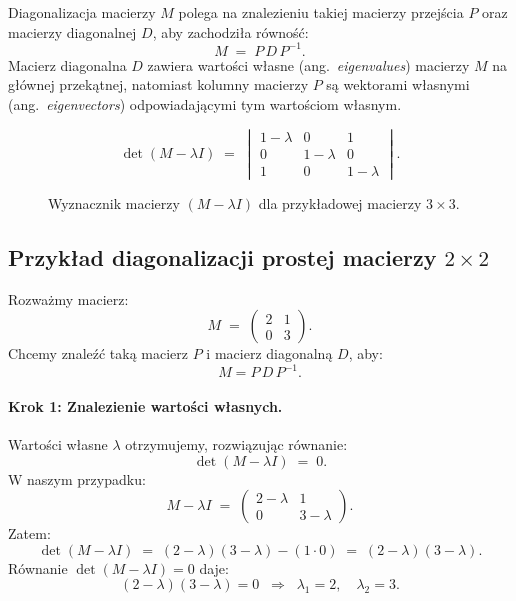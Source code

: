 
\vspace{1em}
\noindent

Diagonalizacja macierzy \(M\) polega na znalezieniu takiej macierzy przejścia \(P\) oraz macierzy diagonalnej \(D\), aby zachodziła równość:
\[
M \;=\; P \,D\, P^{-1}.
\]
Macierz diagonalna \(D\) zawiera wartości własne (ang.~\emph{eigenvalues}) macierzy \(M\) na głównej przekątnej, natomiast kolumny macierzy \(P\) są wektorami własnymi (ang.~\emph{eigenvectors}) odpowiadającymi tym wartościom własnym.


\begin{figure}[h!]
    \centering
    \begin{equation*}
    \det(M - \lambda I) 
    \;=\;
    \begin{vmatrix}
    1 - \lambda & 0 & 1 \\
    0 & 1 - \lambda & 0 \\
    1 & 0 & 1 - \lambda
    \end{vmatrix}.
    \end{equation*}
    \caption{Wyznacznik macierzy $(M - \lambda I)$ dla przykładowej macierzy $3\times3$.}
    \label{fig:matrix-determinant}
\end{figure}


\subsection{Przykład diagonalizacji prostej macierzy \(2 \times 2\)}

Rozważmy macierz:
\[
M \;=\;
\begin{pmatrix}
2 & 1 \\
0 & 3
\end{pmatrix}.
\]
Chcemy znaleźć taką macierz \(P\) i macierz diagonalną \(D\), aby:
\[
M = P\,D\,P^{-1}.
\]

\paragraph{Krok 1: Znalezienie wartości własnych.}
Wartości własne \(\lambda\) otrzymujemy, rozwiązując równanie:
\[
\det(M - \lambda I) \;=\; 0.
\]
W naszym przypadku:
\[
M - \lambda I \;=\;
\begin{pmatrix}
2-\lambda & 1 \\
0 & 3-\lambda
\end{pmatrix}.
\]
Zatem:
\[
\det(M - \lambda I) 
\;=\; (2-\lambda)(3-\lambda) - (1 \cdot 0)
\;=\; (2-\lambda)(3-\lambda).
\]
Równanie \(\det(M - \lambda I) = 0\) daje:
\[
(2-\lambda)(3-\lambda) = 0
\;\;\Longrightarrow\;\;
\lambda_1 = 2, 
\quad \lambda_2 = 3.
\]

